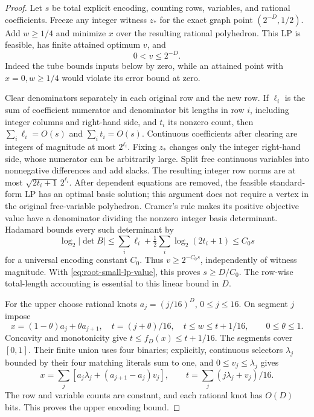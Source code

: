 \begin{proof}
Let $s$ be total explicit encoding, counting rows, variables, and
rational coefficients. Freeze any integer witness $z_*$ for the
exact graph point $(2^{-D},1/2)$. Add $w\ge1/4$ and minimize $x$
over the resulting rational polyhedron. This LP is feasible, has
finite attained optimum $v$, and
\begin{equation}\label{eq:root-small-lp-value}
 0<v\le2^{-D}.
\end{equation}
Indeed the tube bounds inputs below by zero, while an attained point
with $x=0,w\ge1/4$ would violate its error bound at zero.

Clear denominators separately in each original row and the new row.
If $\ell_i$ is the sum of coefficient numerator and denominator bit
lengths in row $i$, including integer columns and right-hand side,
and $t_i$ its nonzero count, then $\sum_i\ell_i=O(s)$ and
$\sum_it_i=O(s)$. Continuous coefficients after clearing are integers
of magnitude at most $2^{\ell_i}$. Fixing $z_*$ changes only the
integer right-hand side, whose numerator can be arbitrarily large.
Split free continuous variables into nonnegative differences and add
slacks. The resulting integer row norms are at most
$\sqrt{2t_i+1}\,2^{\ell_i}$. After dependent equations are removed,
the feasible standard-form LP has an optimal basic solution; this
argument does not require a vertex in the original free-variable
polyhedron. Cramer's rule makes its positive objective value have
a denominator dividing the nonzero integer basis determinant.
Hadamard bounds every such determinant by
\[
 \log_2|\det B|\le\sum_i\ell_i+\tfrac12\sum_i\log_2(2t_i+1)
 \le C_0s
\]
for a universal encoding constant $C_0$. Thus $v\ge2^{-C_0s}$,
independently of witness magnitude. With
\eqref{eq:root-small-lp-value}, this proves $s\ge D/C_0$.
The row-wise total-length accounting is essential to this linear
bound in $D$.

For the upper choose rational knots $a_j=(j/16)^D$, $0\le j\le16$.
On segment $j$ impose
\[
 x=(1-\theta)a_j+\theta a_{j+1},\quad
 t=(j+\theta)/16,\quad t\le w\le t+1/16,
 \qquad0\le\theta\le1.
\]
Concavity and monotonicity give $t\le f_D(x)\le t+1/16$.
The segments cover $[0,1]$. Their finite union uses four binaries;
explicitly, continuous selectors $\lambda_j$ bounded by their four
matching literals sum to one, and $0\le v_j\le\lambda_j$ gives
\[
 x=\sum_j[a_j\lambda_j+(a_{j+1}-a_j)v_j],\qquad
 t=\sum_j(j\lambda_j+v_j)/16.
\]
The row and variable counts are constant, and each rational knot has
$O(D)$ bits. This proves the upper encoding bound.
\end{proof}

